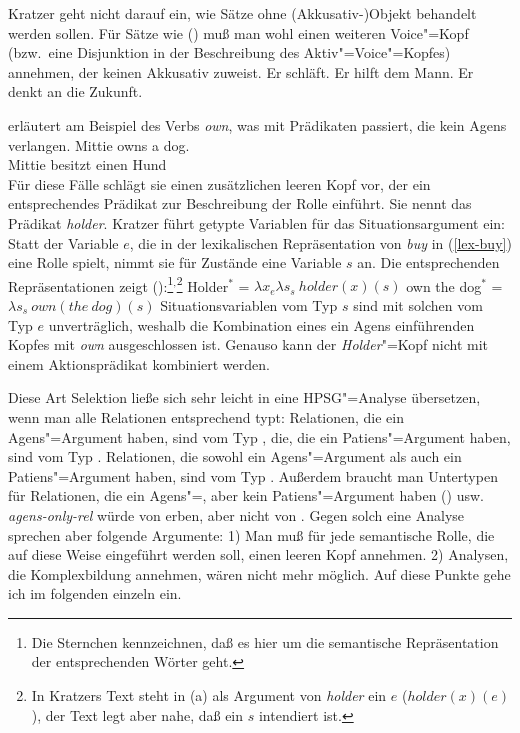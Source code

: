 {Kratzer geht nicht darauf ein, wie Sätze ohne (Akkusativ-)Objekt behandelt werden sollen. Für
Sätze wie () muß man wohl einen weiteren Voice"=Kopf (bzw.\ eine Disjunktion
in der Beschreibung des Aktiv"=Voice"=Kopfes) annehmen, der keinen Akkusativ zuweist.
\eal
\ex Er schläft.
\ex Er hilft dem Mann.
\ex Er denkt an die Zukunft.
\zl

\noindent
\citet[]{Kratzer96a} erläutert am Beispiel des Verbs \emph{own}, was mit Prädikaten passiert,
die kein Agens verlangen.
\ea
\gll Mittie owns a dog.\\
     Mittie besitzt einen Hund\\
\z
Für diese Fälle schlägt sie einen zusätzlichen leeren Kopf vor, der ein entsprechendes
Prädikat zur Beschreibung der Rolle einführt. Sie nennt das Prädikat \emph{holder}.
Kratzer führt getypte Variablen für das Situationsargument ein: Statt der Variable
$e$, die in der lexikalischen Repräsentation von \emph{buy} in (\ref{lex-buy}) eine Rolle
spielt, nimmt sie für Zustände eine Variable $s$ an. Die entsprechenden Repräsentationen
zeigt ():\footnote{
  Die Sternchen kennzeichnen, daß es hier um die semantische Repräsentation der entsprechenden
  Wörter geht.}$^,$\footnote{
  In Kratzers Text steht in (a) als Argument von \emph{holder} ein $e$ ($holder(x)(e)$),
  der Text legt aber nahe, daß ein $s$ intendiert ist.%
} 
\eal
\ex Holder$^*$ = $\lambda x_e \lambda s_s~holder(x)(s)$
\ex own the dog$^*$ = $\lambda s_s~own(the~dog)(s)$
\zl
Situationsvariablen vom Typ $s$ sind mit solchen vom Typ $e$ unverträglich, weshalb
die Kombination eines ein Agens einführenden Kopfes mit \emph{own} ausgeschlossen ist.
Genauso kann der \emph{Holder}"=Kopf nicht mit einem Aktionsprädikat kombiniert werden.

Diese Art Selektion ließe sich sehr leicht in eine HPSG"=Analyse übersetzen, wenn man
alle Relationen entsprechend typt: Relationen, die ein Agens"=Argument haben, sind vom Typ
, die, die ein Patiens"=Argument haben, sind vom Typ .
Relationen, die sowohl ein Agens"=Argument als auch ein Patiens"=Argument haben, sind
vom Typ . Außerdem braucht man Untertypen für Relationen, die
ein Agens"=, aber kein Patiens"=Argument haben () usw. \emph{agens-only-rel}
würde von  erben, aber nicht von . Gegen solch eine Analyse
sprechen aber folgende Argumente: 1) Man muß für jede semantische Rolle, die auf diese Weise
eingeführt werden soll, einen leeren Kopf annehmen. 
2) Analysen, die Komplexbildung annehmen, wären nicht mehr möglich. Auf diese Punkte gehe ich im folgenden einzeln ein. 

}
